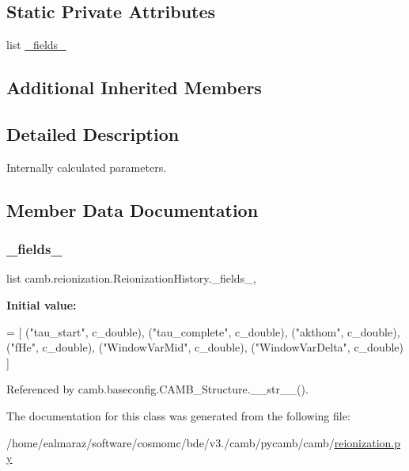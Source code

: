 \subsection*{Static Private Attributes}
\begin{DoxyCompactItemize}
\item 
list \mbox{\hyperlink{classcamb_1_1reionization_1_1ReionizationHistory_a65230f9ffc8b681e8556c6a30b5ca338}{\+\_\+fields\+\_\+}}
\end{DoxyCompactItemize}
\subsection*{Additional Inherited Members}


\subsection{Detailed Description}
\begin{DoxyVerb}Internally calculated parameters.
\end{DoxyVerb}
 

\subsection{Member Data Documentation}
\mbox{\label{classcamb_1_1reionization_1_1ReionizationHistory_a65230f9ffc8b681e8556c6a30b5ca338}} 
\subsubsection{\texorpdfstring{\+\_\+fields\+\_\+}{\_fields\_}}
{\footnotesize\ttfamily list camb.\+reionization.\+Reionization\+History.\+\_\+fields\+\_\+\hspace{0.3cm}{\ttfamily [static]}, {\ttfamily [private]}}

{\bfseries Initial value\+:}
\begin{DoxyCode}
=  [
        (\textcolor{stringliteral}{"tau\_start"}, c\_double),
        (\textcolor{stringliteral}{"tau\_complete"}, c\_double),
        (\textcolor{stringliteral}{"akthom"}, c\_double),
        (\textcolor{stringliteral}{"fHe"}, c\_double),
        (\textcolor{stringliteral}{"WindowVarMid"}, c\_double),
        (\textcolor{stringliteral}{"WindowVarDelta"}, c\_double)
    ]
\end{DoxyCode}


Referenced by camb.\+baseconfig.\+C\+A\+M\+B\+\_\+\+Structure.\+\_\+\+\_\+str\+\_\+\+\_\+().



The documentation for this class was generated from the following file\+:\begin{DoxyCompactItemize}
\item 
/home/ealmaraz/software/cosmomc/bde/v3./camb/pycamb/camb/\mbox{\hyperlink{reionization_8py}{reionization.\+py}}\end{DoxyCompactItemize}
